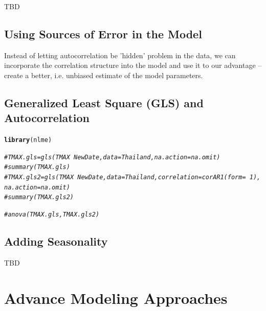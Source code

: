 \documentclass{article}\usepackage[]{graphicx}\usepackage[]{color}
\makeatletter
\newcommand{\hlcom}[1]{\textcolor[rgb]{0.678,0.584,0.686}{\textit{#1}}}%
\newcommand{\hlstd}[1]{\textcolor[rgb]{0.345,0.345,0.345}{#1}}%
\newcommand{\hlkwd}[1]{\textcolor[rgb]{0.737,0.353,0.396}{\textbf{#1}}}%
\newenvironment{kframe}{%
 \def\at@end@of@kframe{}%
 \ifinner\ifhmode%
  \def\at@end@of@kframe{\end{minipage}}%
  \begin{minipage}{\columnwidth}%
 \fi\fi%
 \def\FrameCommand##1{\hskip\@totalleftmargin \hskip-\fboxsep
 \colorbox{shadecolor}{##1}\hskip-\fboxsep
     \hskip-\linewidth \hskip-\@totalleftmargin \hskip\columnwidth}%
 \MakeFramed {\advance\hsize-\width
   \@totalleftmargin\z@ \linewidth\hsize
   \@setminipage}}%
 {\par\unskip\endMakeFramed%
 \at@end@of@kframe}
\newenvironment{knitrout}{}{} %
\makeatother
\begin{document}
TBD

\subsection{Using Sources of Error in the Model}

Instead of letting autocorrelation be 'hidden' problem in the data, we can incorporate the correlation structure into the model and use it to our advantage -- create a better, i.e. unbiased estimate of the model parameters.

\subsection{Generalized Least Square (GLS) and Autocorrelation}

\begin{knitrout}
\color{fgcolor}\begin{kframe}
\begin{alltt}
\hlkwd{library}\hlstd{(nlme)}
\end{alltt}


{\ttfamily\noindent\itshape\color{messagecolor}{\#\# \\\#\# Attaching package: 'nlme'}}

{\ttfamily\noindent\itshape\color{messagecolor}{\#\# The following object is masked from 'package:dplyr':\\\#\# \\\#\#\ \ \ \  collapse}}\begin{alltt}
\hlcom{#TMAX.gls = gls(TMAX ~ NewDate, data = Thailand, na.action=na.omit)}
\hlcom{#summary(TMAX.gls)}
\hlcom{#TMAX.gls2 = gls(TMAX ~ NewDate, data = Thailand, correlation = corAR1(form=~1), na.action=na.omit)}
\hlcom{#summary(TMAX.gls2)}

\hlcom{#anova(TMAX.gls, TMAX.gls2)}
\end{alltt}
\end{kframe}
\end{knitrout}


\subsection{Adding Seasonality}

TBD

\section{Advance Modeling Approaches}
\end{document}

